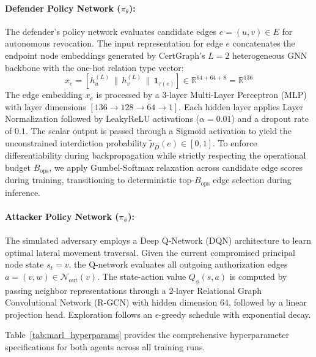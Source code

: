 \paragraph{Defender Policy Network ($\pi_\theta$):}
The defender's policy network evaluates candidate edges $e = (u, v) \in E$ for autonomous revocation. The input representation for edge $e$ concatenates the endpoint node embeddings generated by CertGraph's $L = 2$ heterogeneous GNN backbone with the one-hot relation type vector:
\begin{equation}
x_e = \left[ h_u^{(L)} \,\|\, h_v^{(L)} \,\|\, \mathbf{1}_{\tau(e)} \right] \in \mathbb{R}^{64 + 64 + 8} = \mathbb{R}^{136}
\end{equation}
The edge embedding $x_e$ is processed by a 3-layer Multi-Layer Perceptron (MLP) with layer dimensions $[136 \to 128 \to 64 \to 1]$. Each hidden layer applies Layer Normalization followed by LeakyReLU activations ($\alpha = 0.01$) and a dropout rate of $0.1$. The scalar output is passed through a Sigmoid activation to yield the unconstrained interdiction probability $\tilde{p}_D(e) \in [0, 1]$. To enforce differentiability during backpropagation while strictly respecting the operational budget $B_{\text{ops}}$, we apply Gumbel-Softmax relaxation across candidate edge scores during training, transitioning to deterministic top-$B_{\text{ops}}$ edge selection during inference.

\paragraph{Attacker Policy Network ($\pi_\phi$):}
The simulated adversary employs a Deep Q-Network (DQN) architecture to learn optimal lateral movement traversal. Given the current compromised principal node state $s_t = v$, the Q-network evaluates all outgoing authorization edges $a = (v, w) \in \mathcal{N}_{\text{out}}(v)$. The state-action value $Q_\phi(s, a)$ is computed by passing neighbor representations through a 2-layer Relational Graph Convolutional Network (R-GCN) with hidden dimension $64$, followed by a linear projection head. Exploration follows an $\epsilon$-greedy schedule with exponential decay.

Table~\ref{tab:marl_hyperparams} provides the comprehensive hyperparameter specifications for both agents across all training runs.

